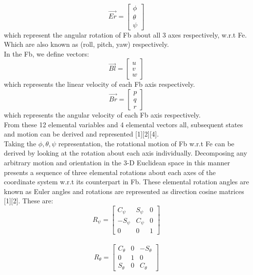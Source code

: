 \documentclass[12pt,a4paper,twoside]{report}
\begin{document}
				\\
				$$
				\vec{Er} = 
				\begin{bmatrix}
					\phi \\
					\theta \\
					\psi
				\end{bmatrix}
				$$
				which represent the angular rotation of Fb about all 3 axes respectively, w.r.t Fe. Which are also known as (roll, pitch, yaw) respectively.
				\\
				In the Fb, we define vectors:
				\\
				$$
				\vec{Bl} = 
				\begin{bmatrix}
					u \\
					v \\
					w
				\end{bmatrix}
				$$
				which represents the linear velocity of each Fb axis respectively.
				\\
				$$
				\vec{Br} = 
				\begin{bmatrix}
					p \\
					q \\
					r
				\end{bmatrix}
				$$
				which represents the angular velocity of each Fb axis respectively.
				\\
				From these 12 elemental variables and 4 elemental vectors all, subsequent states and motion can be derived and represented [1][2][4].
				\\
				Taking the \(\phi, \theta, \psi\) representation, the rotational motion of Fb w.r.t Fe can be derived by looking at the rotation about each axis individually. Decomposing any arbitrary motion and orientation in the 3-D Euclidean space in this manner presents a sequence of three elemental rotations about each axes of the coordinate system w.r.t its counterpart in Fb. These elemental rotation angles are known as Euler angles and rotations are represented as direction cosine matrices [1][2]. These are:
				\\
				$$
				R_\psi = 
				\begin{bmatrix}
					C_\psi & S_\psi & 0  \\
					-S_\psi & C_\psi & 0  \\
					0 & 0 & 1
				\end{bmatrix}
				$$
				\\
				$$
				R_\theta = 
				\begin{bmatrix}
					C_\theta & 0 & -S_\theta \\
					0 & 1 & 0 \\
					S_\theta & 0 & C_\theta
				\end{bmatrix}
				$$
\end{document}
